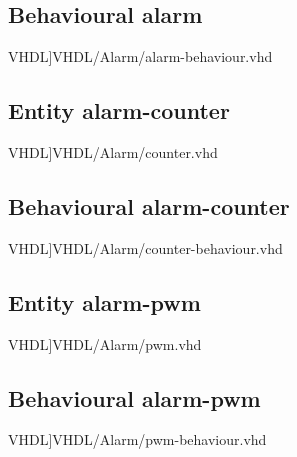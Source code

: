 \subsection{Behavioural alarm}
\scriptsize 
 VHDL]{VHDL/Alarm/alarm-behaviour.vhd}
\normalsize
\label{code:beh_alarm}
\subsection{Entity alarm-counter}
\scriptsize 
 VHDL]{VHDL/Alarm/counter.vhd}
\normalsize
\label{code:ent_alarm_counter}
\subsection{Behavioural alarm-counter}
\scriptsize 
 VHDL]{VHDL/Alarm/counter-behaviour.vhd}
\normalsize
\label{code:beh_alarm_counter}
\subsection{Entity alarm-pwm}
\scriptsize 
 VHDL]{VHDL/Alarm/pwm.vhd}
\normalsize
\label{code:ent_alarm_pwm}
\subsection{Behavioural alarm-pwm}
\scriptsize 
 VHDL]{VHDL/Alarm/pwm-behaviour.vhd}
\normalsize
\label{code:beh_alarm_pwm}
